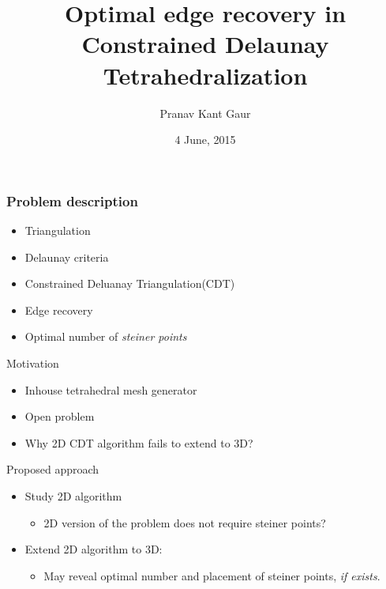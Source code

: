 \documentclass{beamer}
\title[Optimal edge recovery in CDT]{Optimal edge recovery in Constrained Delaunay Tetrahedralization}
\author{Pranav Kant Gaur}
\institute[Computer Division]{Computer graphics and Visualization section, \newline Computer Division}
\date{4 June, 2015}
\begin{document}
\begin{frame}
\titlepage
\end{frame}


\begin{frame}
\frametitle{Problem description}
\begin{itemize}
\item Triangulation
\item Delaunay criteria
\item Constrained Deluanay Triangulation(CDT)
\item Edge recovery
\item Optimal number of \textit{steiner points}
\end{itemize}
\end{frame}

\begin{frame}{Motivation}
\begin{itemize}
\item Inhouse tetrahedral mesh generator
\item Open problem 	
\item Why 2D CDT algorithm fails to extend to 3D? 
\end{itemize}		
\end{frame}

\begin{frame}{Proposed approach}
\begin{itemize}
\item Study 2D algorithm
	\begin{itemize}	
            \item 2D version of the problem does not require steiner points?
	\end{itemize}
\item Extend 2D algorithm to 3D:
	\begin{itemize}
		\item May reveal optimal number and placement of steiner points, \textit{if exists}.
	\end{itemize}		
\end{itemize}
\end{frame}
\end{document}
